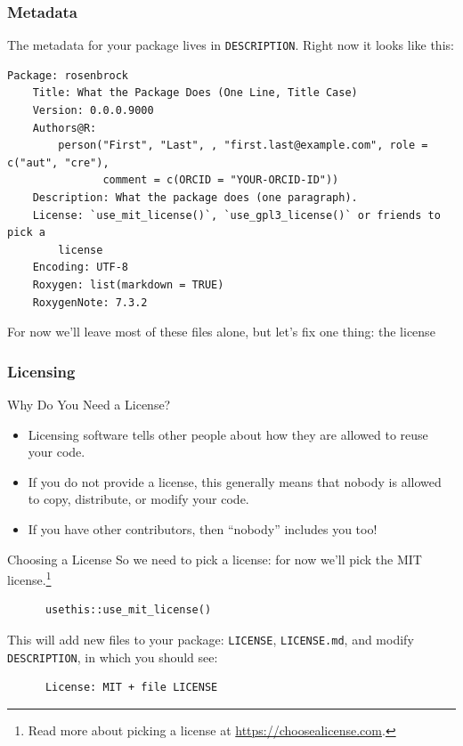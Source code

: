 \documentclass[aspectratio=1610,onlytextwidth]{beamer}
\begin{document}
\begin{frame}[c,fragile]
  \frametitle{Metadata}

  The metadata for your package lives in \texttt{DESCRIPTION}. Right now it looks like this:
  \begin{lstlisting}[basicstyle=\ttfamily\small]
    Package: rosenbrock
    Title: What the Package Does (One Line, Title Case)
    Version: 0.0.0.9000
    Authors@R:
        person("First", "Last", , "first.last@example.com", role = c("aut", "cre"),
               comment = c(ORCID = "YOUR-ORCID-ID"))
    Description: What the package does (one paragraph).
    License: `use_mit_license()`, `use_gpl3_license()` or friends to pick a
        license
    Encoding: UTF-8
    Roxygen: list(markdown = TRUE)
    RoxygenNote: 7.3.2
  \end{lstlisting}

  \pause\bigskip

  For now we'll leave most of these files alone, but let's
  fix one thing: the license
\end{frame}

\begin{frame}[c,fragile]
  \frametitle{Licensing}

  \begin{block}{Why Do You Need a License?}
    \begin{itemize}[<+->]
      \item Licensing software tells other people about how they are allowed to reuse your
            code.
      \item If you do not provide a license, this generally means that \alert{nobody is allowed to copy,
              distribute, or modify your code.}

      \item If you have other contributors, then ``nobody'' includes \alert{you too!}
    \end{itemize}

  \end{block}

  \pause

  \begin{block}{Choosing a License}
    So we need to pick a license: for now we'll pick the MIT license.\footnote<5->{Read more about picking a license at \url{https://choosealicense.com}.}

    \medskip\pause

    \begin{lstlisting}
      usethis::use_mit_license()
    \end{lstlisting}

    \medskip

    This will add new files to your package: \texttt{LICENSE}, \texttt{LICENSE.md}, and
    modify \texttt{DESCRIPTION}, in which you should see:

    \begin{lstlisting}
      License: MIT + file LICENSE
    \end{lstlisting}
  \end{block}
\end{frame}
\end{document}
